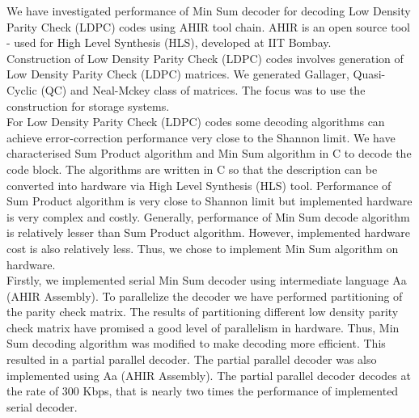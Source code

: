 {%
\noindent We have investigated performance of Min Sum decoder for  decoding Low Density Parity Check (LDPC) codes using AHIR tool chain. AHIR is an open source tool - used for High Level Synthesis (HLS),  developed at IIT Bombay. \\
Construction of Low Density Parity Check (LDPC) codes involves generation of Low Density Parity Check (LDPC) matrices. We generated Gallager, Quasi-Cyclic (QC) and Neal-Mckey class of matrices. The focus was to use the construction for storage systems. \\
For Low Density Parity Check (LDPC) codes some decoding algorithms can achieve error-correction performance very close to the Shannon limit. We have characterised Sum Product algorithm and Min Sum algorithm in C to decode the code block. The algorithms are written in C so that the description can be converted into hardware via High Level Synthesis (HLS) tool. Performance of Sum Product algorithm is very close to Shannon limit but implemented hardware is very complex and costly. Generally, performance of Min Sum decode algorithm is relatively lesser than Sum Product algorithm. However, implemented hardware cost is also relatively less. Thus, we chose to implement Min Sum algorithm on hardware.\\
Firstly, we implemented serial Min Sum decoder using intermediate language Aa (AHIR Assembly). To parallelize the decoder we have performed partitioning of the parity check matrix. The results of partitioning different low density parity check matrix have promised a good level of parallelism in hardware. Thus, Min Sum decoding algorithm was modified to make decoding more efficient. This resulted in a partial parallel decoder. The partial parallel decoder was also implemented using Aa (AHIR Assembly). The partial parallel decoder decodes at the rate of 300 Kbps, that is nearly two times the performance of implemented serial decoder. \\[0.2cm]


\clearpage 
}



